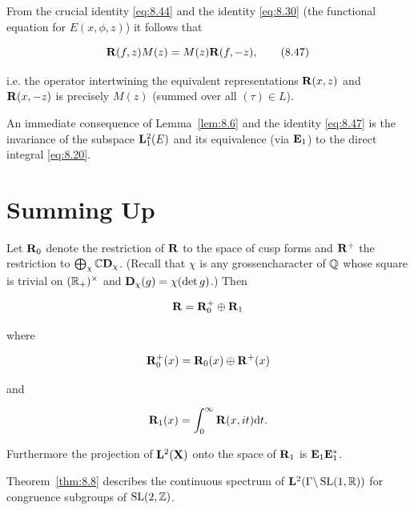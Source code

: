 \begin{remark}\label{rem:8.7}

From the crucial identity \eqref{eq:8.44} and the identity \eqref{eq:8.30} (the functional equation for $E(x,\phi,z)$) it follows that

\begin{equation}\label{eq:8.47}
\mathbf{R}(f,z)M(z) = M(z)\mathbf{R}(f,-z),\tag{8.47}
\end{equation}

i.e. the operator intertwining the equivalent representations $\mathbf{R}(x,z)$ and $\mathbf{R}(x,-z)$ is precisely $M(z)$ (summed over all $(\tau) \in L$).

\end{remark}

An immediate consequence of Lemma~\ref{lem:8.6} and the identity \eqref{eq:8.47} is the invariance of the subspace $\mathbf{L}_{1}^{2}(E)$ and its equivalence (via $\mathbf{E}_{1}$) to the direct integral \eqref{eq:8.20}.

\section{Summing Up}\label{sec:8e}

\begin{theorem}\label{thm:8.8}

Let $\mathbf{R}_{0}$ denote the restriction of $\mathbf{R}$ to the space of cusp forms and $\mathbf{R}^{+}$ the restriction to $\bigoplus_{\chi}\mathbb{C} \mathbf{D}_{\chi}$. (Recall that $\chi$ is any grossencharacter of $\mathbb{Q}$ whose square is trivial on $(\mathbb{R}_{+})^{\times}$ and $\mathbf{D}_{\chi}(g) = \chi(\det g)$.) Then

\[
\mathbf{R} = \mathbf{R}_{0}^{+}\oplus\mathbf{R}_{1}
\]

where

\[
\mathbf{R}_{0}^{+}(x) = \mathbf{R}_{0}(x)\oplus\mathbf{R}^{+}(x)
\]

and

\[
\mathbf{R}_{1}(x) = \int_{0}^{\infty} \mathbf{R}(x,it) \mathrm{d} t.
\]

Furthermore the projection of $\mathbf{L}^{2}(\mathbf{X})$ onto the space of $\mathbf{R}_{1}$ is $\mathbf{E}_{1}\mathbf{E}_{1}^{*}$.

\end{theorem}

\begin{corollary}\label{cor:8.9}

Theorem~\ref{thm:8.8} describes the continuous spectrum of $\mathbf{L}^{2}(\Gamma\backslash\operatorname{SL}(1,\mathbb{R}))$ for congruence subgroups of $\operatorname{SL}(2,\mathbb{Z})$.

\end{corollary}

